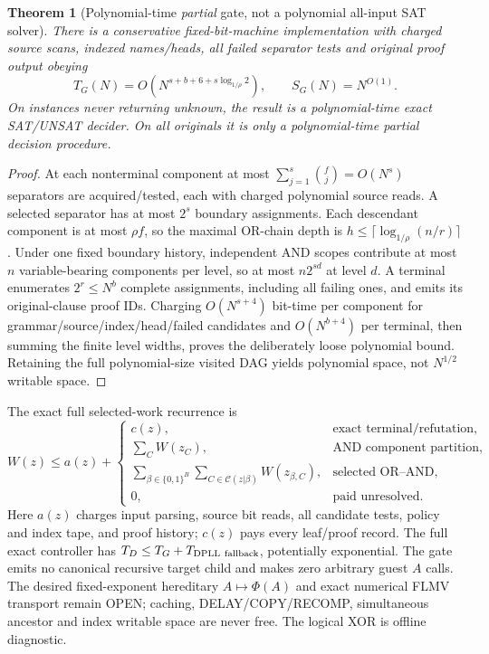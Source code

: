 \documentclass[11pt]{article}
\newtheorem{theorem}{Theorem}
\begin{document}
\begin{theorem}[Polynomial-time \emph{partial} gate, not a polynomial all-input SAT solver]
There is a conservative fixed-bit-machine implementation with charged source scans, indexed names/heads, all failed separator tests and original proof output obeying
\[
T_G(N)=O(N^{s+b+6+s\log_{1/\rho}2}),\qquad S_G(N)=N^{O(1)}.
\]
On instances never returning unknown, the result is a polynomial-time exact SAT/UNSAT decider. On all originals it is only a polynomial-time partial decision procedure.
\end{theorem}
\begin{proof}
At each nonterminal component at most $\sum_{j=1}^s\binom fj=O(N^s)$ separators are acquired/tested, each with charged polynomial source reads. A selected separator has at most $2^s$ boundary assignments. Each descendant component is at most $\rho f$, so the maximal OR-chain depth is $h\le\lceil\log_{1/\rho}(n/r)\rceil$. Under one fixed boundary history, independent AND scopes contribute at most $n$ variable-bearing components per level, so at most $n2^{sd}$ at level $d$. A terminal enumerates $2^r\le N^b$ complete assignments, including all failing ones, and emits its original-clause proof IDs. Charging $O(N^{s+4})$ bit-time per component for grammar/source/index/head/failed candidates and $O(N^{b+4})$ per terminal, then summing the finite level widths, proves the deliberately loose polynomial bound. Retaining the full polynomial-size visited DAG yields polynomial space, not $N^{1/2}$ writable space. \end{proof}

The exact full selected-work recurrence is
\[
W(z)\le a(z)+\begin{cases}
c(z),&\text{exact terminal/refutation},\\
\sum_CW(z_C),&\text{AND component partition},\\
\sum_{\beta\in\{0,1\}^B}\sum_{C\in\mathcal C(z|\beta)}W(z_{\beta,C}),&\text{selected OR--AND},\\
0,&\text{paid unresolved}.
\end{cases}
\]
Here $a(z)$ charges input parsing, source bit reads, all candidate tests, policy and index tape, and proof history; $c(z)$ pays every leaf/proof record. The full exact controller has $T_D\le T_G+T_{\rm DPLL\ fallback}$, potentially exponential. The gate emits no canonical recursive target child and makes zero arbitrary guest $A$ calls. The desired fixed-exponent hereditary $A\mapsto\Phi(A)$ and exact numerical FLMV transport remain OPEN; caching, DELAY/COPY/RECOMP, simultaneous ancestor and index writable space are never free. The logical XOR is offline diagnostic.
\end{document}
